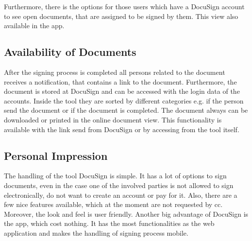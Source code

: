 Furthermore, there is the options for those users which have a DocuSign account to see open documents, that are assigned to be signed by them. This view also available in the \gls{app}.

\subsection{Availability of Documents}
After the signing process is completed all persons related to the document receives a notification, that contains a link to the document. Furthermore, the document is stored at DocuSign and can be accessed with the login data of the accounts. Inside the tool they are sorted by different categories e.g. if the person send the document or if the document is completed. The document always can be downloaded or printed in the online document view. This functionality is available with the link send from DocuSign or by accessing from the tool itself.

\subsection{Personal Impression}
The handling of the tool DocuSign is simple. It has a lot of options to sign documents, even in the case one of the involved parties is not allowed to sign electronically, do not want to create an account or pay for it. Also, there are a few nice features available, which at the moment are not requested by \gls{cc}. Moreover, the look and feel is user friendly. Another big advantage of DocuSign is the \gls{app}, which cost nothing. It has the most functionalities as the web application and makes the handling of signing process mobile.